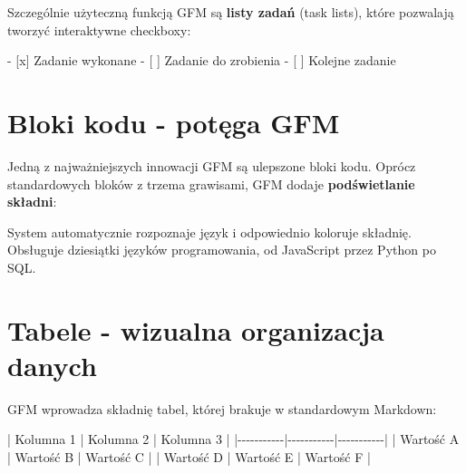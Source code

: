 \documentclass[
  polish,
  letterpaper,
  DIV=11,
  numbers=noendperiod]{scrreprt}
\newenvironment{Shaded}{\begin{snugshade}}{\end{snugshade}}
\newcommand{\FunctionTok}[1]{\textcolor[rgb]{0.28,0.35,0.67}{#1}}
\newcommand{\InformationTok}[1]{\textcolor[rgb]{0.37,0.37,0.37}{#1}}
\newcommand{\NormalTok}[1]{\textcolor[rgb]{0.00,0.23,0.31}{#1}}
\newcommand{\OperatorTok}[1]{\textcolor[rgb]{0.37,0.37,0.37}{#1}}
\newcommand{\PreprocessorTok}[1]{\textcolor[rgb]{0.68,0.00,0.00}{#1}}
\newcommand{\SpecialStringTok}[1]{\textcolor[rgb]{0.13,0.47,0.30}{#1}}
\newcommand{\VariableTok}[1]{\textcolor[rgb]{0.07,0.07,0.07}{#1}}
\begin{document}
Szczególnie użyteczną funkcją GFM są \textbf{listy zadań} (task lists),
które pozwalają tworzyć interaktywne checkboxy:

\begin{Shaded}
\begin{Highlighting}[]
\SpecialStringTok{{-} }\VariableTok{[x]}\NormalTok{ Zadanie wykonane}
\SpecialStringTok{{-} }\VariableTok{[ ]}\NormalTok{ Zadanie do zrobienia}
\SpecialStringTok{{-} }\VariableTok{[ ]}\NormalTok{ Kolejne zadanie}
\end{Highlighting}
\end{Shaded}

\section{Bloki kodu - potęga GFM}\label{bloki-kodu---potux119ga-gfm}

Jedną z najważniejszych innowacji GFM są ulepszone bloki kodu. Oprócz
standardowych bloków z trzema grawisami, GFM dodaje
\textbf{podświetlanie składni}:

\begin{Shaded}
\end{Shaded}

System automatycznie rozpoznaje język i odpowiednio koloruje składnię.
Obsługuje dziesiątki języków programowania, od JavaScript przez Python
po SQL.

\section{Tabele - wizualna organizacja
danych}\label{tabele---wizualna-organizacja-danych}

GFM wprowadza składnię tabel, której brakuje w standardowym Markdown:

\begin{Shaded}
\begin{Highlighting}[]
\PreprocessorTok{|}\NormalTok{ Kolumna 1 }\PreprocessorTok{|}\NormalTok{ Kolumna 2 }\PreprocessorTok{|}\NormalTok{ Kolumna 3 }\PreprocessorTok{|}
\PreprocessorTok{|{-}{-}{-}{-}{-}{-}{-}{-}{-}{-}{-}|{-}{-}{-}{-}{-}{-}{-}{-}{-}{-}{-}|{-}{-}{-}{-}{-}{-}{-}{-}{-}{-}{-}|}
\PreprocessorTok{|}\NormalTok{ Wartość A }\PreprocessorTok{|}\NormalTok{ Wartość B }\PreprocessorTok{|}\NormalTok{ Wartość C }\PreprocessorTok{|}
\PreprocessorTok{|}\NormalTok{ Wartość D }\PreprocessorTok{|}\NormalTok{ Wartość E }\PreprocessorTok{|}\NormalTok{ Wartość F }\PreprocessorTok{|}
\end{Highlighting}
\end{Shaded}
\end{document}
